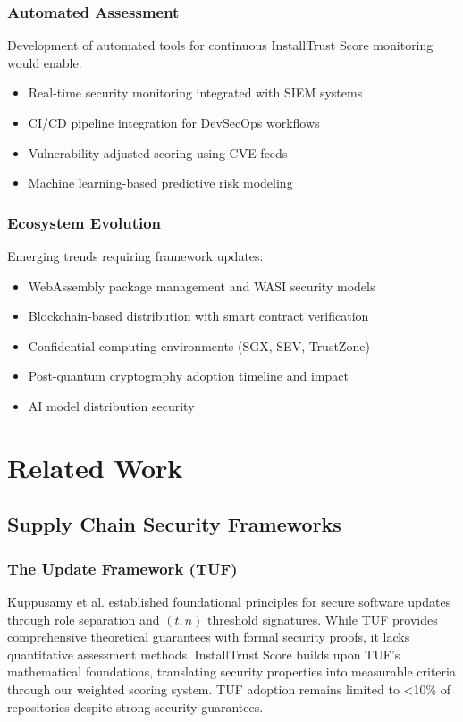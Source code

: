 \documentclass[11pt,a4paper]{article}
\begin{document}
\subsubsection{Automated Assessment}

Development of automated tools for continuous InstallTrust Score monitoring would enable:
\begin{itemize}
    \item Real-time security monitoring integrated with SIEM systems
    \item CI/CD pipeline integration for DevSecOps workflows
    \item Vulnerability-adjusted scoring using CVE feeds
    \item Machine learning-based predictive risk modeling \cite{kumar2024mlops}
\end{itemize}

\subsubsection{Ecosystem Evolution}

Emerging trends requiring framework updates:
\begin{itemize}
    \item WebAssembly package management and WASI security models
    \item Blockchain-based distribution with smart contract verification
    \item Confidential computing environments (SGX, SEV, TrustZone)
    \item Post-quantum cryptography adoption timeline and impact
    \item AI model distribution security \cite{jiang2024llm}
\end{itemize}

\section{Related Work}

\subsection{Supply Chain Security Frameworks}

\subsubsection{The Update Framework (TUF)}
Kuppusamy et al. \cite{kuppusamy2016tuf} established foundational principles for secure software updates through role separation and $(t,n)$ threshold signatures. While TUF provides comprehensive theoretical guarantees with formal security proofs, it lacks quantitative assessment methods. InstallTrust Score builds upon TUF's mathematical foundations, translating security properties into measurable criteria through our weighted scoring system. TUF adoption remains limited to <10\% of repositories despite strong security guarantees.
\end{document}
